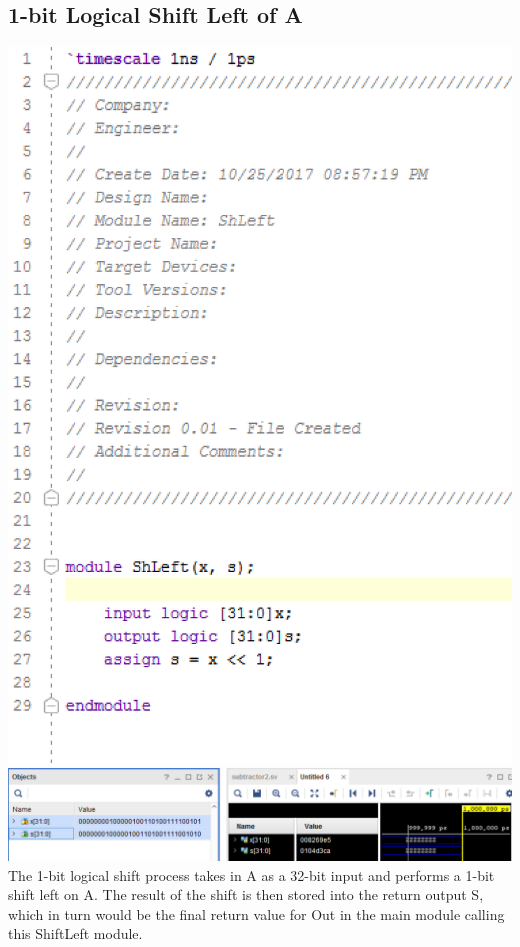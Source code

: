 \documentclass{article}
\begin{document}
\subsection{1-bit Logical Shift Left of A}
\includegraphics[scale=0.5]{photos/shleft_code}
\break
\includegraphics[scale=0.5]{photos/shleft_simulation}
\break
The 1-bit logical shift process takes in A as a 32-bit input and performs a 1-bit shift left on A. The result of the shift is then stored into the return output S, which in turn would be the final return value for Out in the main module calling this ShiftLeft module.
\end{document}
